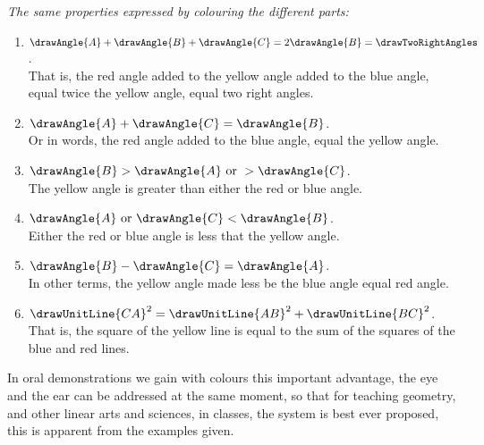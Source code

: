 \documentclass[booklanguage=english]{byrnebook}
\begin{document}
\baselineskip

\begin{center}
\emph{The same properties expressed by colouring the different parts:}
\end{center}

\baselineskip

\begin{enumerate}
\item $\drawAngle{A} + \drawAngle{B} + \drawAngle{C} = 2 \drawAngle{B} = \drawTwoRightAngles$. \\ That is, the red angle added to the yellow angle added to the blue angle, equal twice the yellow angle, equal two right angles.
\item $\drawAngle{A} + \drawAngle{C} = \drawAngle{B}$. \\ Or in words, the red angle added to the blue angle, equal the yellow angle.
\item $\drawAngle{B} > \drawAngle{A} \mbox{ or } > \drawAngle{C}$. \\ The yellow angle is greater than either the red or blue angle.
\item $\drawAngle{A} \mbox{ or } \drawAngle{C} < \drawAngle{B}$. \\ Either the red or blue angle is less that the yellow angle.
\item $\drawAngle{B} - \drawAngle{C} = \drawAngle{A}$. \\ In other terms, the yellow angle made less be the blue angle equal red angle. %
\item $\drawUnitLine{CA}^2 = \drawUnitLine{AB}^2 + \drawUnitLine{BC}^2$. \\ That is, the square of the yellow line is equal to the sum of the squares of the blue and red lines.
\end{enumerate}

In oral demonstrations we gain with colours this important advantage, the eye and the ear can be addressed at the same moment, so that for teaching geometry, and other linear arts and sciences, in classes, the system is best ever proposed, this is apparent from the examples given.

\end{document}
